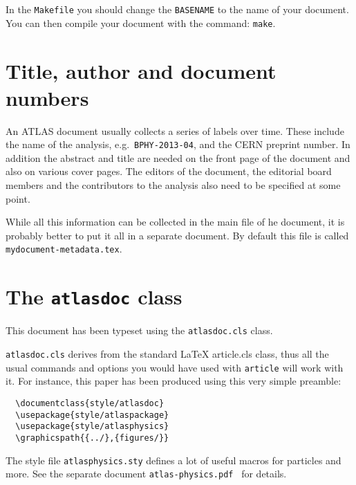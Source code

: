 \documentclass{style/atlasdoc}
\begin{document}
In the \texttt{Makefile} you should change the \texttt{BASENAME} to the name of your document.
You can then compile your document with the command: \texttt{make}.


\section{Title, author and document numbers}
\label{sec:metadata}

An ATLAS document usually collects a series of labels over time.
These include the name of the analysis, e.g.\ \texttt{BPHY-2013-04}, 
and the CERN preprint number.
In addition the abstract and title are needed on the front page of the document and also on various cover pages.
The editors of the document, the editorial board members and the contributors to the analysis
also need to be specified at some point.

While all this information can be collected in the main file of he document, 
it is probably better to put it all in a separate document.
By default this file is called \texttt{mydocument-metadata.tex}.


\section{The \texttt{atlasdoc} class}
\label{app:atlasdoc}

This document has been typeset using the \texttt{atlasdoc.cls} class.

\texttt{atlasdoc.cls} derives from the standard \LaTeX{} {article.cls}
class, thus all the usual commands and options you would have used
with \texttt{article} will work with it. For instance, this paper has
been produced using this very simple preamble:

\begin{verbatim}
  \documentclass{style/atlasdoc}
  \usepackage{style/atlaspackage}
  \usepackage{style/atlasphysics}
  \graphicspath{{../},{figures/}}
\end{verbatim}

The style file \texttt{atlasphysics.sty} defines a lot of useful
macros for particles and more. See the separate document
\texttt{atlas-physics.pdf}~\cite{atlas-physics} for details.
\end{document}
